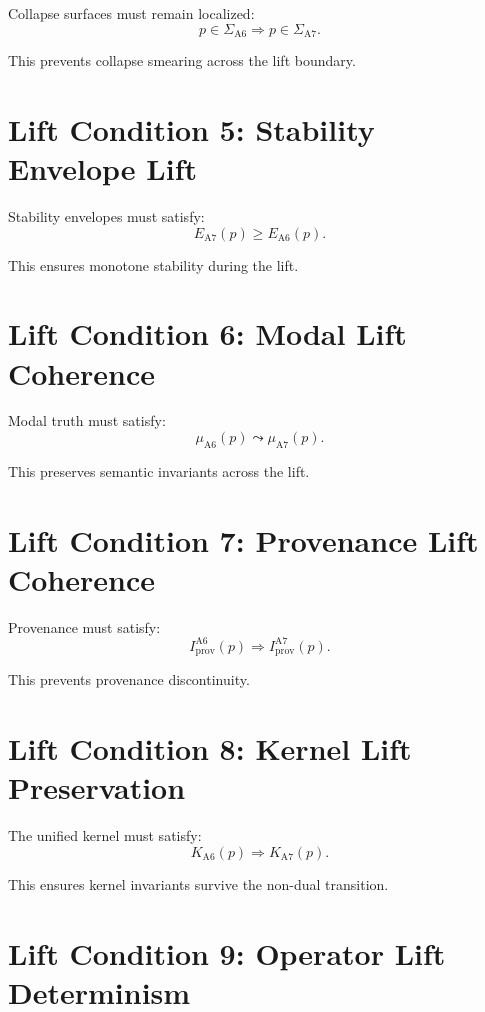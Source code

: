 \documentclass[11pt]{article}
\begin{document}
Collapse surfaces must remain localized:
\[
p \in \Sigma_{\mathrm{A6}}
  \Rightarrow p \in \Sigma_{\mathrm{A7}}.
\]

This prevents collapse smearing across the lift boundary.

\section{Lift Condition 5: Stability Envelope Lift}

Stability envelopes must satisfy:
\[
E_{\mathrm{A7}}(p)
  \ge E_{\mathrm{A6}}(p).
\]

This ensures monotone stability during the lift.

\section{Lift Condition 6: Modal Lift Coherence}

Modal truth must satisfy:
\[
\mu_{\mathrm{A6}}(p) \leadsto \mu_{\mathrm{A7}}(p).
\]

This preserves semantic invariants across the lift.

\section{Lift Condition 7: Provenance Lift Coherence}

Provenance must satisfy:
\[
I_{\mathrm{prov}}^{\mathrm{A6}}(p)
  \Rightarrow
I_{\mathrm{prov}}^{\mathrm{A7}}(p).
\]

This prevents provenance discontinuity.

\section{Lift Condition 8: Kernel Lift Preservation}

The unified kernel must satisfy:
\[
K_{\mathrm{A6}}(p)
  \Rightarrow
K_{\mathrm{A7}}(p).
\]

This ensures kernel invariants survive the non-dual transition.

\section{Lift Condition 9: Operator Lift Determinism}
\end{document}
